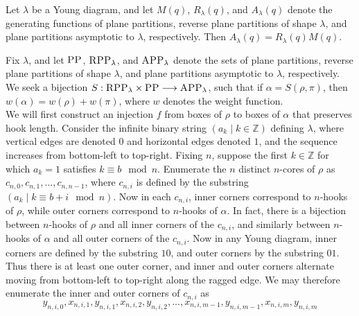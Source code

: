 





\begin{Theorem}
	Let $\lambda$ be a Young diagram, and let $M(q)$, $R_\lambda(q)$, and $A_\lambda(q)$ denote the generating functions of plane partitions, reverse plane partitions of shape $\lambda$, and plane partitions asymptotic to $\lambda$, respectively. Then $A_\lambda(q) = R_\lambda(q) M(q)$.
	
\end{Theorem}



\begin{Proof}
	Fix $\lambda$, and let $\textsc{PP}$, $\textsc{RPP}_\lambda$, and $\textsc{APP}_\lambda$ denote the sets of plane partitions, reverse plane partitions of shape $\lambda$, and plane partitions asymptotic to $\lambda$, respectively. We seek a bijection $S : \textsc{RPP}_\lambda \times \textsc{PP} \longrightarrow \textsc{APP}_\lambda$, such that if $\alpha = S(\rho, \pi)$, then $w(\alpha) = w(\rho) + w(\pi)$, where $w$ denotes the weight function.\\
	
	We will first construct an injection $f$ from boxes of $\rho$ to boxes of $\alpha$ that preserves hook length. Consider the infinite binary string $(a_k \mid k \in \mathbb{Z})$ defining $\lambda$, where vertical edges are denoted $0$ and horizontal edges denoted $1$, and the sequence increases from bottom-left to top-right. Fixing $n$, suppose the first $k \in \mathbb{Z}$ for which $a_k = 1$ satisfies $k \equiv b \mod n$. Enumerate the $n$ distinct $n$-cores of $\rho$ as $c_{n, 0}, c_{n, 1}, ..., c_{n, n - 1}$, where $c_{n, i}$ is defined by the substring $(a_k \mid k \equiv b + i \mod n)$. Now in each $c_{n, i}$, inner corners correspond to $n$-hooks of $\rho$, while outer corners correspond to $n$-hooks of $\alpha$. In fact, there is a bijection between $n$-hooks of $\rho$ and all inner corners of the $c_{n, i}$, and similarly between $n$-hooks of $\alpha$ and all outer corners of the $c_{n, i}$. Now in any Young diagram, inner corners are defined by the substring $10$, and outer corners by the substring $01$. Thus there is at least one outer corner, and inner and outer corners alternate moving from bottom-left to top-right along the ragged edge. We may therefore enumerate the inner and outer corners of $c_{n, i}$ as
	$$
		y_{n, i, 0}, x_{n, i, 1}, y_{n, i, 1}, x_{n, i, 2}, y_{n, i, 2}, ..., x_{n, i, m - 1}, y_{n, i, m - 1}, x_{n, i, m}, y_{n, i, m}
	$$
	

\end{Proof}
